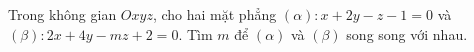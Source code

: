 \begin{ex}
Trong không gian $Oxyz$, cho hai mặt phẳng $(\alpha)\colon x+2y-z-1=0$ và $(\beta)\colon 2x+4y-mz+2=0$. Tìm $m$ để $(\alpha)$ và $(\beta)$ song song với nhau.
\end{ex}
